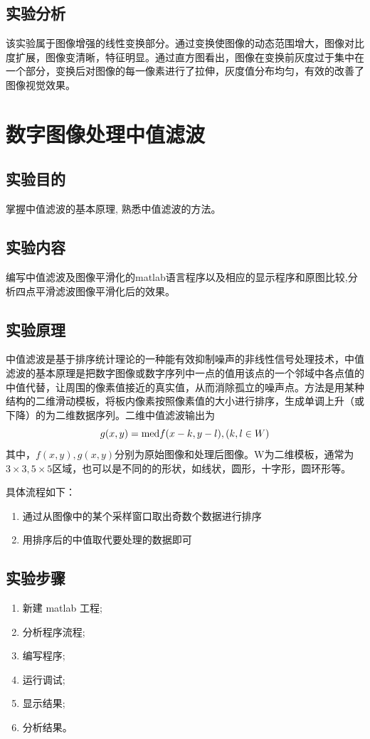 \documentclass[12pt]{article}
\begin{document}
\subsection{实验分析}
该实验属于图像增强的线性变换部分。通过变换使图像的动态范围增大，图像对比度扩展，图像变清晰，特征明显。通过直方图看出，图像在变换前灰度过于集中在一个部分，变换后对图像的每一像素进行了拉伸，灰度值分布均匀，有效的改善了图像视觉效果。
\newpage
\section{数字图像处理中值滤波}
\setcounter{equation}{0}
\setcounter{table}{0}
\setcounter{figure}{0}
\subsection{实验目的}
掌握中值滤波的基本原理, 熟悉中值滤波的方法。
\subsection{实验内容}
编写中值滤波及图像平滑化的matlab语言程序以及相应的显示程序和原图比较,分析四点平滑滤波图像平滑化后的效果。
\subsection{实验原理}
中值滤波是基于排序统计理论的一种能有效抑制噪声的非线性信号处理技术，中值滤波的基本原理是把数字图像或数字序列中一点的值用该点的一个邻域中各点值的中值代替，让周围的像素值接近的真实值，从而消除孤立的噪声点。方法是用某种结构的二维滑动模板，将板内像素按照像素值的大小进行排序，生成单调上升（或下降）的为二维数据序列。二维中值滤波输出为$$g(x,y)={\rm med} {f(x-k,y-l),(k,l\in W)}$$  其中，$f(x,y),g(x,y)$分别为原始图像和处理后图像。W为二维模板，通常为$3\times 3,5\times 5$区域，也可以是不同的的形状，如线状，圆形，十字形，圆环形等。\par
具体流程如下：
\begin{enumerate}
  \item 通过从图像中的某个采样窗口取出奇数个数据进行排序
 \item 用排序后的中值取代要处理的数据即可
\end{enumerate}
\subsection{实验步骤}
\begin{enumerate}
  \item 新建 matlab 工程;
\item 分析程序流程;
\item 编写程序;
\item 运行调试;
\item 显示结果;
\item 分析结果。
\end{enumerate}
\end{document}
